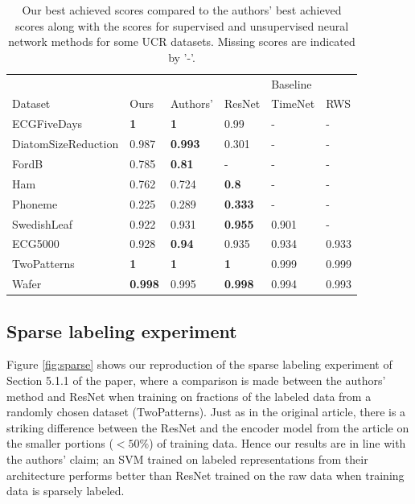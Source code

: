 \begin{table}[h!]
\setlength{\tabcolsep}{7.5pt}
\caption{Our best achieved scores compared to the authors' best achieved scores along with the scores for supervised and unsupervised neural network methods for some UCR datasets. Missing scores are indicated by '-'.}
\label{tab:table1nn}
\centering
\begin{tabular}{llllll}
\hline
                    &                &                &\vrule & Baseline \\

Dataset             & Ours           & Authors'       &\vrule ResNet         & TimeNet & RWS   \\
\hline
ECGFiveDays         & \textbf{1}          & \textbf{1}     & 0.99           & -       & -     \\
DiatomSizeReduction & 0.987 & \textbf{0.993} & 0.301          & -       & -     \\
FordB               & 0.785          & \textbf{0.81}  & -              & -       & -     \\
Ham                 & 0.762          & 0.724          & \textbf{0.8}   & -       & -     \\
Phoneme             & 0.225           & 0.289          & \textbf{0.333} & -       & -     \\
SwedishLeaf         & 0.922          & 0.931          & \textbf{0.955} & 0.901   & -    \\ \hdashline
ECG5000             & 0.928          & \textbf{0.94} & 0.935          & 0.934   & 0.933 \\
TwoPatterns         & \textbf{1}     & \textbf{1}     & \textbf{1}     & 0.999   & 0.999 \\
Wafer               & \textbf{0.998}          & 0.995 & \textbf{0.998} & 0.994   & 0.993  

\end{tabular}
\end{table}
\newpage
\subsection{Sparse labeling experiment}

Figure \ref{fig:sparse} shows our reproduction of the sparse labeling experiment of Section 5.1.1 of the paper, where a comparison is made between the authors' method and ResNet when training on fractions of the labeled data from a randomly chosen dataset (TwoPatterns). Just as in the original article, there is a striking difference between the ResNet and the encoder model from the article on the smaller portions ($<50\%$) of training data. Hence our results are in line with the authors' claim; an SVM trained on labeled representations from their architecture performs better than ResNet trained on the raw data when training data is sparsely labeled.

